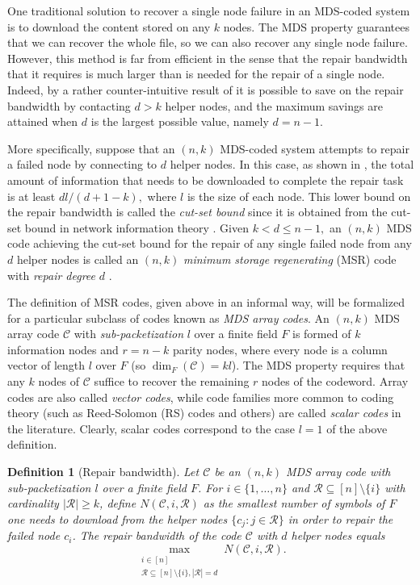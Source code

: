 \documentclass[11pt,onecolumn]{IEEEtran}
\newtheorem{definition}{Definition}
\newcommand{\cC}{\mathcal{C}}
\newcommand{\cR}{\mathcal{R}}
\begin{document}
One traditional solution to recover a single node failure in an MDS-coded system is to download the content stored on any $k$ nodes. The 
MDS property guarantees that we can recover the whole file, so we can also recover any single node failure. However, this method is far 
from efficient in the sense that the repair bandwidth that it requires is much larger than {is needed} for the repair of a single 
node. Indeed, by a rather counter-intuitive result of \cite{Dimakis10} it is possible to save on the repair bandwidth by
contacting $d>k$ helper nodes, and the maximum savings are attained when $d$ is the largest possible value, namely $d=n-1$. 

More specifically, suppose that an $(n,k)$ MDS-coded system attempts to repair a failed node by connecting to $d$ helper nodes. In this case, as shown in \cite{Dimakis10}, the total amount of information that needs to be downloaded
to complete the repair task is at least $dl/(d+1-k),$ where $l$ is the size of each node. This lower bound on the repair bandwidth is called the {\em cut-set bound} since it is obtained from the cut-set bound in network information theory \cite{ElGamal81}.
Given $k< d\le n-1,$ an $(n,k)$ MDS code achieving the cut-set bound for the repair of any single failed node from any $d$ helper 
nodes is called an $(n,k)$ {\em minimum storage regenerating} (MSR) code with {\em repair degree} $d$ \cite{Dimakis10}.

The definition of MSR codes, given above in an informal way, will be formalized for a particular subclass of codes known as {\em MDS array codes}. 
An $(n,k)$ MDS array code $\cC$ with {\em sub-packetization} $l$ over a finite field $F$ is formed of
$k$ information nodes and $r=n-k$ parity nodes, where every node is a column vector of length $l$ over $F$ (so $\dim_F (\cC)= kl$).
The MDS property requires that any $k$ nodes of $\cC$ suffice to recover the remaining $r$ nodes of the codeword. Array codes are also called {\em vector codes}, while code families more common to coding theory  
 (such as Reed-Solomon (RS) codes and others) are called {\em scalar codes} in the literature. Clearly, scalar codes correspond to the case $l=1$ of the above definition.

\begin{definition}[Repair bandwidth]
Let $\cC$ be an $(n,k)$ MDS array code with sub-packetization $l$ over a finite field $F$.
 For $i\in\{1,\dots,n\}$ and $\cR\subseteq[n]\setminus\{i\}$ with cardinality $|\cR|\ge k$, define 
$N(\cC,i,\cR)$ as the smallest number of symbols of $F$ one needs to download from the helper nodes $\{c_j:j\in\cR\}$ in order to repair the failed node $c_i$. The \emph{repair bandwidth} of the code $\cC$ with $d$ helper nodes equals 
    $$
    \max_{\substack {i\in [n]\\  \cR\subseteq[n]\setminus\{i\}, |\cR|=d}} N(\cC,i,\cR).
    $$
\end{definition}
\end{document}
